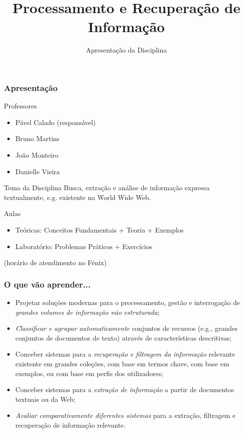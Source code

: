 \documentclass{beamer}
\title{Processamento e Recuperação de Informação}
\subtitle{Apresentação da Disciplina}
\begin{document}
\maketitle

\begin{frame} 
    \frametitle{Apresentação}
    \begin{block}{Professores}
        \begin{itemize}
        \item Pável Calado (responsável)
        \item Bruno Martins
        \item João Monteiro
        \item Danielle Vieira
        \end{itemize}
    \end{block}
    \begin{block}{Tema da Disciplina}
        Busca, extração e análise de informação expressa textualmente, e.g. existente na World Wide Web.
    \end{block}
    \begin{block}{Aulas}
        \begin{itemize}
        \item Teóricas: Conceitos Fundamentais + Teoria + Exemplos
        \item Laboratório: Problemas Práticos + Exercícios
        \end{itemize}
    \end{block}
    \small\hfill (horário de atendimento no Fénix) 
\end{frame}

\begin{frame} \frametitle{O que vão aprender...}
    \begin{itemize}
	\item Projetar soluções modernas para o processamento, gestão e interrogação de \emph{grandes volumes de informação não estruturada};
	\item \emph{Classificar e agrupar automaticamente} conjuntos de recursos (e.g., grandes conjuntos de documentos de texto) através de características descritivas;
	\item Conceber sistemas para a \emph{recuperação e filtragem da informação} relevante existente em grandes coleções, com base em termos chave, com base em exemplos, ou com base em perfis dos utilizadores;
	\item Conceber sistemas para a \emph{extração de informação} a partir de documentos textuais ou da Web;
	\item \emph{Avaliar comparativamente diferentes sistemas} para a extração, filtragem e recuperação de informação relevante.	
    \end{itemize}
\end{frame}
\end{document}
